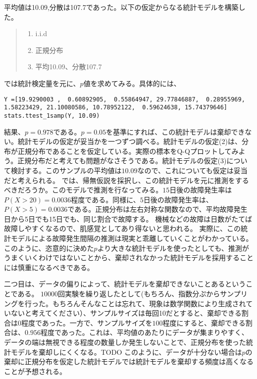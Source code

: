 \documentclass[a4paper,11pt,dvipdfmx]{jsarticle}
\begin{document}
平均値は10.09,分散は107.7であった。以下の仮定からなる統計モデルを構築した。
\begin{quote}
    \begin{enumerate}[(1)]
\item i.i.d
\item 正規分布
\item 平均10.09、分散107.7
\end{enumerate}
\end{quote}
では統計検定量を元に、$p$値を求めてみる。具体的には、

\begin{lstlisting}
Y =[19.9290003 ,  0.60892905,  0.55864947, 29.77846887,  0.28955969,  1.58223429, 21.10080586, 10.78952122,  0.59624638, 15.74379646]
stats.ttest_1samp(Y, 10.09)
\end{lstlisting}

結果、$p=0.978$である。$p=0.05$を基準にすれば、この統計モデルは棄却できない。統計モデルの仮定が妥当かを一つずつ調べる。統計モデルの仮定(2)は、分布が正規分布であることを仮定している。実際の標本をQ-Qプロットしてみよう。正規分布だと考えても問題がなさそうである。統計モデルの仮定(3)について検討する。このサンプルの平均値は$10.09$なので、これについても仮定は妥当だと考えられる。
では、帰無仮説を採択し、この統計モデルを元に推測をするべきだろうか。このモデルで推測を行なってみる。$15$日後の故障発生率は$P(X>20)=0.0036$程度である。同様に、$5$日後の故障発生率は、$P(X>5)=0.0036$である。正規分布は左右対称な関数なので、平均故障発生日から5日でも15日でも、同じ割合で故障する。 
機械などの故障は日数がたてば故障しやすくなるので、肌感覚としてあり得ないと思われる。
実際に、この統計モデルによる故障発生間隔の推測は現実と乖離していくことがわかっている。
このように、恣意的に決めた$p$より大きな統計モデルを使ったとしても、推測がうまくいくわけではないことから、棄却されなかった統計モデルを採用することには慎重になるべきである。

二つ目は、データの偏りによって、統計モデルを棄却できないことあるということである。
$10000$回実験を繰り返したとして(もちろん、指数分ぷからサンプリングを行った。もちろんそんなことは忘れて、現象は数学関数により生成されていないと考えてください）、サンプルサイズは毎回10だとすると、棄却できる割合は0程度であった。一方で、サンプルサイズを$100$程度にすると、棄却できる割合は、$0.956$程度であった。これは、平均値のあたりにデータが集まりやすく、データの端は無視できる程度の数量しか発生しないことで、正規分布を使った統計モデルを棄却しにくくなる。TODO
このように、データが十分ない場合は$p$の棄却に正規分布を仮定した統計モデルでは統計モデルを棄却する頻度は高くなることが予想される。
\end{document}
